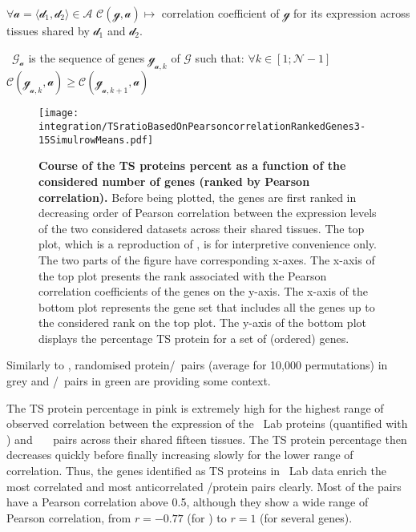 \begin{eqlist}[\setlength{\itemsep}{0em}%
         \setlength{\topsep}{0em}%
         \setlength{\partopsep}{0em}%
         \setlength{\parskip}{0em}%
         \setlength{\parsep}{0em}]
             $\forall \mathcal{a} = \langle \mathcal{d}_1,\mathcal{d}_2\rangle
             \in \mathcal{A}$
             $\mathcal{C}(\mathcal{g},\mathcal{a}) \longmapsto$ correlation
             coefficient of $\mathcal{g}$ for its expression across tissues
             shared by $\mathcal{d}_1$ and $\mathcal{d}_2$.
             \item[\textbullet\ $\mathcal{G_{a}}$] is the sequence of
                 genes $\mathcal{g}_{\mathcal{a},k}$ of $\mathcal{G}$ such that:
                 $\forall k \in [1; \mathcal{N}-1]$
                 $\mathcal{C}(\mathcal{g}_{\mathcal{a},k},\mathcal{a}) ≥
                 \mathcal{C}(\mathcal{g}_{\mathcal{a},k+1},\mathcal{a})$
 \end{eqlist}

\begin{figure}[!ht]
    \texttt{[image: integration/TSratioBasedOnPearsoncorrelationRankedGenes3-15SimulrowMeans.pdf]}\centering
    \vspace{-3mm}
    \caption[Course of the TS proteins percentage as a function of
    the considered number of genes (ranked by Pearson correlation)]{\label{fig:Spe_Cor}%
    \textbf{Course of the TS proteins percent as a function of the considered
    number of genes (ranked by Pearson correlation).}
    Before being plotted,
    the genes are first ranked in decreasing order of Pearson correlation
    between the expression levels of the two considered datasets
    across their shared tissues.
    The top plot, which is a reproduction of ,
    is for interpretive convenience only.
    The two parts of the figure have corresponding x-axes.
    The x-axis of the top plot presents the rank associated with
    the Pearson correlation coefficients of the genes on the y-axis.
    The x-axis of the bottom plot represents the gene set that includes
    all the genes up to the considered rank on the top plot.
    The y-axis of the bottom plot displays the percentage \gls{TS} protein
    for a set of (ordered) genes.
    }
\end{figure}

Similarly to ,
randomised protein/\mRNA\ pairs (average for 10,000 permutations) in grey
and \mRNA/\mRNA\ pairs in green are providing some context.

The \gls{TS} protein percentage in pink is extremely high
for the highest range of observed correlation between the expression of
the \pandey\ Lab proteins (quantified with \PPKM) and
\uhlen\ \etal\ \mRNAs\ pairs
across their shared fifteen tissues.
The \gls{TS} protein percentage then decreases quickly
before finally increasing slowly for the lower range of correlation.
Thus, the genes identified as \gls{TS} proteins in \pandey\ Lab data enrich
the most correlated and most anticorrelated \mRNA/protein pairs clearly.
Most of the pairs have a Pearson correlation above 0.5,
although they show a wide range of Pearson correlation,
from $r= -0.77$ (for ) to $r=1$ (for several genes).

